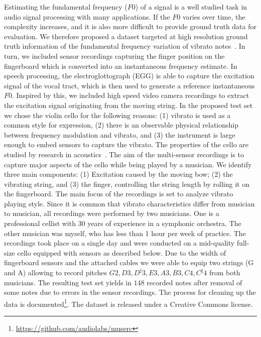 Estimating the fundamental frequency ($F0$) of a signal is a well studied task in audio signal processing with many applications. 
If the $F0$ varies over time, the complexity increases, and it is also more difficult to provide ground truth data for evaluation.
We therefore proposed a dataset targeted at high resolution ground truth information of the fundamental frequency variation of vibrato notes~\cite{stoeter15acm}.
In turn, we included sensor recordings capturing the finger position on the fingerboard which is converted into an instantaneous frequency estimate. 
In speech processing, the electroglottograph (EGG) is able to capture the excitation signal of the vocal tract, which is then used to generate a reference instantaneous $F0$.
Inspired by this, we included high speed video camera recordings to extract the excitation signal originating from the moving string.
In the proposed test set we chose the violin cello for the following reasons: (1) vibrato is used as a common style for expression, (2) there is an observable physical relationship between frequency modulation and vibrato, and (3) the instrument is large enough to embed sensors to capture the vibrato. The properties of the cello are studied by research in acoustics~\cite{woodhouse04, woodhouse99}.
The aim of the multi-sensor recordings is to capture major aspects of the cello while being played by a musician. We identify three main components: (1) Excitation caused by the moving bow; (2) the vibrating string, and (3) the finger, controlling the string length by rolling it on the fingerboard.
The main focus of the recordings is set to analyze vibrato playing style. Since it is common that vibrato characteristics differ from musician to musician, all recordings were performed by two musicians. One is a professional cellist with 30 years of experience in a symphonic orchestra. 
The other musician was myself, who has less than 1 hour per week of practice.
The recordings took place on a single day and were conducted on a mid-quality full-size cello equipped with sensors as described below. Due to the width of fingerboard sensors and the attached cables we were able to equip two strings (G and A) allowing to record pitches ${G2, D3, D^\sharp3, E3, A3, B3, C4, C^\sharp4}$ from both musicians. The resulting test set yields in $148$ recorded notes after removal of some notes due to errors in the sensor recordings. The process for cleaning up the data is documented\footnote{\url{https://github.com/audiolabs/muserc}}. The dataset is released under a Creative Commons license.

